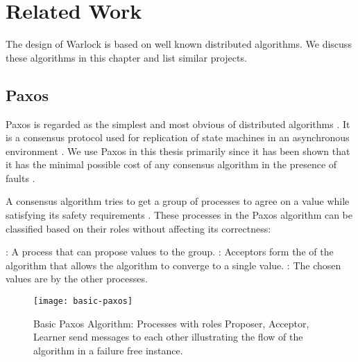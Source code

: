 \chapter{Related Work}
\label{chapter:related.work}

The design of Warlock is based on well known distributed algorithms. We discuss
these algorithms in this chapter and list similar projects.

\section{Paxos}
\label{section:paxos}

Paxos is regarded as the simplest and most obvious of distributed algorithms
\citep{Lamport01}. It is a consensus protocol used for replication of state
machines in an asynchronous environment \citep{Lamport98}. We use Paxos in this
thesis primarily since it has been shown that it has the minimal possible cost
of any consensus algorithm in the presence of faults \citep{KeidarR03}.

A consensus algorithm tries to get a group of processes to agree on a value
while satisfying its safety requirements%
.
These processes in the Paxos algorithm can be classified based on their roles
without affecting its correctness:

\begin{itemize}
  : A process that can propose values to the group.
  : Acceptors form the  of the algorithm that allows
  the algorithm to converge to a single value.
  : The chosen values are  by the other processes.
\end{itemize}

\begin{figure}
  \texttt{[image: basic-paxos]}
      \caption[Basic Paxos]{%
        Basic Paxos Algorithm: Processes with roles \dash{} Proposer, Acceptor,
        Learner \dash{} send messages to each other illustrating the flow of the
        algorithm in a failure free instance.}
      \label{figure:basic_paxos}
  \normalcaption
\end{figure}

